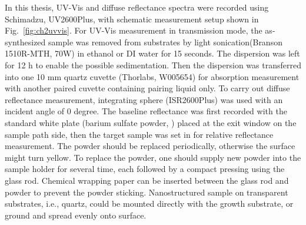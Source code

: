 In this thesis, UV-Vis and diffuse reflectance spectra were recorded using Schimadzu, UV2600Plus, with schematic measurement setup shown in Fig.~\ref{fig:ch2uvvis}. For UV-Vis measurement in transmission mode, the as-synthesized sample was removed from substrates by light sonication(Branson 1510R-MTH, 70W) in ethanol or DI water for 15 seconds. The dispersion was left for 12 h to enable the possible sedimentation. Then the dispersion was transferred into one 10 mm quartz cuvette (Thorlabs, W005654) for absorption measurement with another paired cuvette containing pairing liquid only. To carry out diffuse reflectance measurement, integrating sphere (ISR2600Plus) was used with an incident angle of 0 degree. The baseline reflectance was first recorded with the standard white plate (barium sulfate powder, ) placed at the exit window on the sample path side, then the target sample was set in for relative reflectance measurement. The  powder should be replaced periodically, otherwise the surface might turn yellow. To replace the  powder, one should supply new powder into the sample holder for several time, each followed by a compact pressing using the glass rod. Chemical wrapping paper can be inserted between the glass rod and  powder to prevent the powder sticking. Nanostructured sample on transparent substrates, i.e., quartz, could be mounted directly with the growth substrate, or ground and spread evenly onto  surface.



